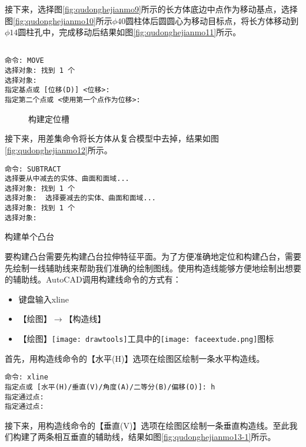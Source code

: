 \begin{procedure}
接下来，选择图\ref{fig:qudonghejianmo9}所示的长方体底边中点作为移动基点，选择图\ref{fig:qudonghejianmo10}所示$\phi 40$圆柱体后圆圆心为移动目标点，将长方体移动到$\phi 14$圆柱孔中，完成移动后结果如图\ref{fig:qudonghejianmo11}所示。
\begin{lstlisting}

命令: MOVE
选择对象: 找到 1 个
选择对象:
指定基点或 [位移(D)] <位移>:
指定第二个点或 <使用第一个点作为位移>:
\end{lstlisting}

\begin{figure}[htbp]
\centering
{}\hspace{60pt}
\caption{构建定位槽}
\end{figure}
 
接下来，用差集命令将长方体从复合模型中去掉，结果如图\ref{fig:qudonghejianmo12}所示。
\begin{lstlisting}
命令: SUBTRACT
选择要从中减去的实体、曲面和面域...
选择对象: 找到 1 个
选择对象:  选择要减去的实体、曲面和面域...
选择对象: 找到 1 个
选择对象:
\end{lstlisting}

\item 构建单个凸台

要构建凸台需要先构建凸台拉伸特征平面。为了方便准确地定位和构建凸台，需要先绘制一线辅助线来帮助我们准确的绘制图线。使用构造线能够方便地绘制出想要的辅助线。AutoCAD调用构建线命令的方式有：
\begin{itemize}
	\item 键盘输入xline
	\item 【绘图】$\rightarrow$【构造线】
	\item 【绘图】\texttt{[image: drawtools]}工具中的\texttt{[image: faceextude.png]}图标	
\end{itemize}

首先，用构造线命令的【水平(H)】选项在绘图区绘制一条水平构造线。

\begin{lstlisting}
命令: xline
指定点或 [水平(H)/垂直(V)/角度(A)/二等分(B)/偏移(O)]: h
指定通过点:
指定通过点:
\end{lstlisting}

接下来，用构造线命令的【垂直(V)】选项在绘图区绘制一条垂直构造线。至此我们构建了两条相互垂直的辅助线，结果如图\ref{fig:qudonghejianmo13-1}所示。


\end{procedure}
